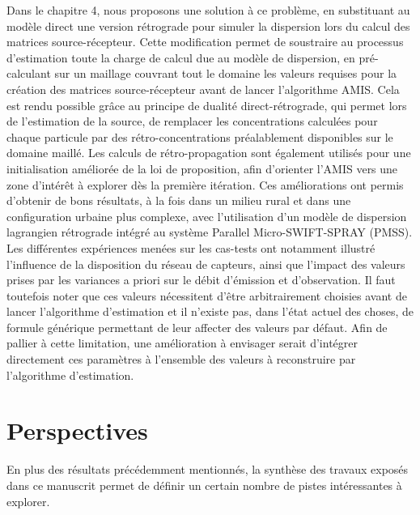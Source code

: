 Dans le chapitre 4, nous proposons une solution à ce problème, en substituant au modèle direct une version rétrograde pour simuler la dispersion lors du calcul des matrices source-récepteur. Cette modification permet de soustraire au processus d'estimation toute la charge de calcul due au modèle de dispersion, en pré-calculant sur un maillage couvrant tout le domaine les valeurs requises pour la création des matrices source-récepteur avant de lancer l'algorithme AMIS. Cela est rendu possible grâce au principe de dualité direct-rétrograde, qui permet lors de l'estimation de la source, de remplacer les concentrations calculées pour chaque particule par des rétro-concentrations préalablement disponibles sur le domaine maillé. Les calculs de rétro-propagation sont également utilisés pour une initialisation améliorée de la loi de proposition, afin d'orienter l'AMIS vers une zone d'intérêt à explorer dès la première itération. Ces améliorations ont permis d'obtenir de bons résultats, à la fois dans un milieu rural et dans une configuration urbaine plus complexe, avec l'utilisation d'un modèle de dispersion lagrangien rétrograde intégré au système Parallel Micro-SWIFT-SPRAY (PMSS). Les différentes expériences menées sur les cas-tests ont notamment illustré l'influence de la disposition du réseau de capteurs, ainsi que l'impact des valeurs prises par les variances a priori sur le débit d'émission et d'observation. Il faut toutefois noter que ces valeurs nécessitent d'être arbitrairement choisies avant de lancer l'algorithme d'estimation et il n'existe pas, dans l'état actuel des choses, de formule générique permettant de leur affecter des valeurs par défaut. Afin de pallier à cette limitation, une amélioration à envisager serait d'intégrer directement ces paramètres à l'ensemble des valeurs à reconstruire par l'algorithme d'estimation.

\section{Perspectives}

En plus des résultats précédemment mentionnés, la synthèse des travaux exposés dans ce manuscrit permet de définir un certain nombre de pistes intéressantes à explorer.\\

